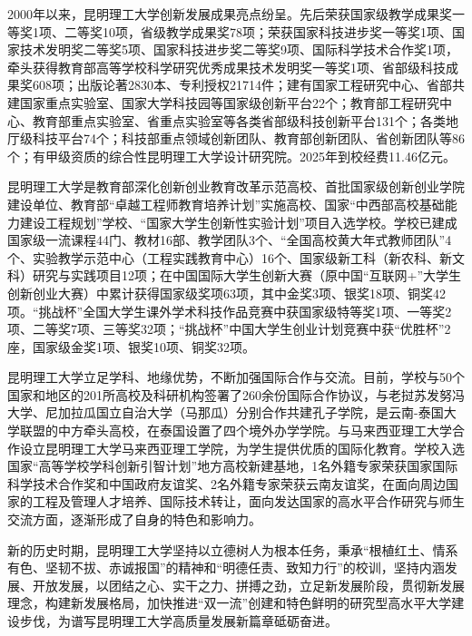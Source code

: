 2000年以来，昆明理工大学创新发展成果亮点纷呈。先后荣获国家级教学成果奖一等奖1项、二等奖10项，省级教学成果奖78项；荣获国家科技进步奖一等奖1项、国家技术发明奖二等奖5项、国家科技进步奖二等奖9项、国际科学技术合作奖1项，牵头获得教育部高等学校科学研究优秀成果技术发明奖一等奖1项、省部级科技成果奖608项；出版论著2830本、专利授权21714件；建有国家工程研究中心、省部共建国家重点实验室、国家大学科技园等国家级创新平台22个；教育部工程研究中心、教育部重点实验室、省重点实验室等各类省部级科技创新平台131个；各类地厅级科技平台74个；科技部重点领域创新团队、教育部创新团队、省创新团队等86个；有甲级资质的综合性昆明理工大学设计研究院。2025年到校经费11.46亿元。

昆明理工大学是教育部深化创新创业教育改革示范高校、首批国家级创新创业学院建设单位、教育部“卓越工程师教育培养计划”实施高校、国家“中西部高校基础能力建设工程规划”学校、“国家大学生创新性实验计划”项目入选学校。学校已建成国家级一流课程44门、教材16部、教学团队3个、“全国高校黄大年式教师团队”4个、实验教学示范中心（工程实践教育中心）16个、国家级新工科（新农科、新文科）研究与实践项目12项；在中国国际大学生创新大赛（原中国“互联网+”大学生创新创业大赛）中累计获得国家级奖项63项，其中金奖3项、银奖18项、铜奖42项。“挑战杯”全国大学生课外学术科技作品竞赛中获国家级特等奖1项、一等奖2项、二等奖7项、三等奖32项；“挑战杯”中国大学生创业计划竞赛中获“优胜杯”2座，国家级金奖1项、银奖10项、铜奖32项。

昆明理工大学立足学科、地缘优势，不断加强国际合作与交流。目前，学校与50个国家和地区的201所高校及科研机构签署了260余份国际合作协议，与老挝苏发努冯大学、尼加拉瓜国立自治大学（马那瓜）分别合作共建孔子学院，是云南-泰国大学联盟的中方牵头高校，在泰国设置了四个境外办学学院。与马来西亚理工大学合作设立昆明理工大学马来西亚理工学院，为学生提供优质的国际化教育。学校入选国家“高等学校学科创新引智计划”地方高校新建基地，1名外籍专家荣获国家国际科学技术合作奖和中国政府友谊奖、2名外籍专家荣获云南友谊奖，在面向周边国家的工程及管理人才培养、国际技术转让，面向发达国家的高水平合作研究与师生交流方面，逐渐形成了自身的特色和影响力。

新的历史时期，昆明理工大学坚持以立德树人为根本任务，秉承“根植红土、情系有色、坚韧不拔、赤诚报国”的精神和“明德任责、致知力行”的校训，坚持内涵发展、开放发展，以团结之心、实干之力、拼搏之劲，立足新发展阶段，贯彻新发展理念，构建新发展格局，加快推进“双一流”创建和特色鲜明的研究型高水平大学建设步伐，为谱写昆明理工大学高质量发展新篇章砥砺奋进。